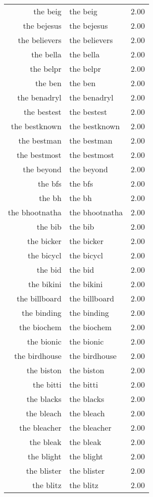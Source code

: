 \begin{table}[ht]
\begin{tabular}{rlr}
  the beig & the beig & 2.00 \\ 
  the bejesus & the bejesus & 2.00 \\ 
  the believers & the believers & 2.00 \\ 
  the bella & the bella & 2.00 \\ 
  the belpr & the belpr & 2.00 \\ 
  the ben & the ben & 2.00 \\ 
  the benadryl & the benadryl & 2.00 \\ 
  the bestest & the bestest & 2.00 \\ 
  the bestknown & the bestknown & 2.00 \\ 
  the bestman & the bestman & 2.00 \\ 
  the bestmost & the bestmost & 2.00 \\ 
  the beyond & the beyond & 2.00 \\ 
  the bfs & the bfs & 2.00 \\ 
  the bh & the bh & 2.00 \\ 
  the bhootnatha & the bhootnatha & 2.00 \\ 
  the bib & the bib & 2.00 \\ 
  the bicker & the bicker & 2.00 \\ 
  the bicycl & the bicycl & 2.00 \\ 
  the bid & the bid & 2.00 \\ 
  the bikini & the bikini & 2.00 \\ 
  the billboard & the billboard & 2.00 \\ 
  the binding & the binding & 2.00 \\ 
  the biochem & the biochem & 2.00 \\ 
  the bionic & the bionic & 2.00 \\ 
  the birdhouse & the birdhouse & 2.00 \\ 
  the biston & the biston & 2.00 \\ 
  the bitti & the bitti & 2.00 \\ 
  the blacks & the blacks & 2.00 \\ 
  the bleach & the bleach & 2.00 \\ 
  the bleacher & the bleacher & 2.00 \\ 
  the bleak & the bleak & 2.00 \\ 
  the blight & the blight & 2.00 \\ 
  the blister & the blister & 2.00 \\ 
  the blitz & the blitz & 2.00 \\ 

\end{tabular}
\end{table}

